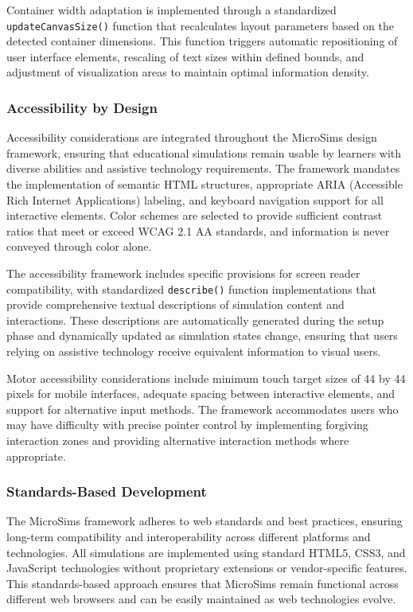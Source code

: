 Container width adaptation is implemented through a standardized \texttt{updateCanvasSize()} function that recalculates layout parameters based on the detected container dimensions. This function triggers automatic repositioning of user interface elements, rescaling of text sizes within defined bounds, and adjustment of visualization areas to maintain optimal information density.

\subsubsection{Accessibility by Design}

Accessibility considerations are integrated throughout the MicroSims design framework, ensuring that educational simulations remain usable by learners with diverse abilities and assistive technology requirements. The framework mandates the implementation of semantic HTML structures, appropriate ARIA (Accessible Rich Internet Applications) labeling, and keyboard navigation support for all interactive elements. Color schemes are selected to provide sufficient contrast ratios that meet or exceed WCAG 2.1 AA standards, and information is never conveyed through color alone.

The accessibility framework includes specific provisions for screen reader compatibility, with standardized \texttt{describe()} function implementations that provide comprehensive textual descriptions of simulation content and interactions. These descriptions are automatically generated during the setup phase and dynamically updated as simulation states change, ensuring that users relying on assistive technology receive equivalent information to visual users.

Motor accessibility considerations include minimum touch target sizes of 44 by 44 pixels for mobile interfaces, adequate spacing between interactive elements, and support for alternative input methods. The framework accommodates users who may have difficulty with precise pointer control by implementing forgiving interaction zones and providing alternative interaction methods where appropriate.

\subsubsection{Standards-Based Development}

The MicroSims framework adheres to web standards and best practices, ensuring long-term compatibility and interoperability across different platforms and technologies. All simulations are implemented using standard HTML5, CSS3, and JavaScript technologies without proprietary extensions or vendor-specific features. This standards-based approach ensures that MicroSims remain functional across different web browsers and can be easily maintained as web technologies evolve.

